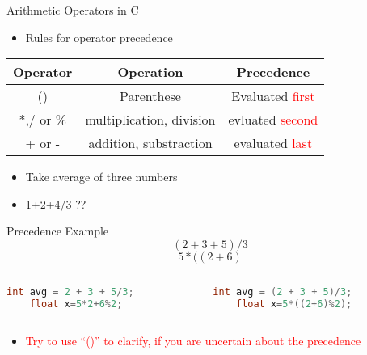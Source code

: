 \begin{frame}[fragile]{Arithmetic Operators in C}
\begin{itemize}
	\item {Rules for operator precedence}
\end{itemize}
\begin{table}
\begin{center}
\begin{tabular}{|c|c|c|}
\hline 
Operator & Operation & Precedence \\ \hline \hline
() & Parenthese & Evaluated \textcolor{red}{first} \\ \hline
*,/ or \%&multiplication, division & evluated \textcolor{red}{second} \\ \hline
+ or - & addition, substraction & evaluated \textcolor{red}{last} \\ \hline
\hline
\end{tabular}
\end{center}
\end{table}
\begin{itemize}
	\item {Take average of three numbers}
	\item {1+2+4/3 ??}
\end{itemize}
\end{frame}

\begin{frame}[fragile]{Precedence Example}
\begin{equation}
(2+3+5)/3 \nonumber
\end{equation}
\begin{equation}
5*((2+6)%
\end{equation}
\begin{columns}
\begin{column}{0.45\linewidth}
	\begin{lstlisting}[numbers=none, language=c]
	int avg = 2 + 3 + 5/3;
	float x=5*2+6%2;
	\end{lstlisting}
\end{column}
\begin{column}{0.45\linewidth}
	\begin{lstlisting}[numbers=none, language=c]
	int avg = (2 + 3 + 5)/3;
	float x=5*((2+6)%2);
	\end{lstlisting}
\end{column}
\end{columns}
\begin{itemize}
	\item {\textcolor{red}{Try to use ``()'' to clarify, if you are uncertain about the precedence}}
\end{itemize}
\end{frame}

